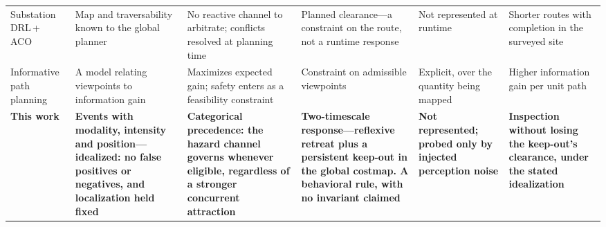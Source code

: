 \begin{table}[!t]
\begin{tabular}{p{2.0cm}p{2.9cm}p{3.0cm}p{2.8cm}p{2.4cm}p{2.6cm}}
Substation DRL\,+\,ACO~\cite{zhang2025substation} &
Map and traversability known to the global planner &
No reactive channel to arbitrate; conflicts resolved at planning time &
Planned clearance---a constraint on the route, not a runtime response &
Not represented at runtime &
Shorter routes with completion in the surveyed site \\

Informative path planning~\cite{ipp2024nonconvex} &
A model relating viewpoints to information gain &
Maximizes expected gain; safety enters as a feasibility constraint &
Constraint on admissible viewpoints &
Explicit, over the quantity being mapped &
Higher information gain per unit path \\

\textbf{This work} &
\textbf{Events with modality, intensity and position---idealized: no false
positives or negatives, and localization held fixed} &
\textbf{Categorical precedence: the hazard channel governs whenever eligible,
regardless of a stronger concurrent attraction} &
\textbf{Two-timescale response---reflexive retreat plus a persistent keep-out in
the global costmap. A behavioral rule, with no invariant claimed} &
\textbf{Not represented; probed only by injected perception noise} &
\textbf{Inspection without losing the keep-out's clearance, under the stated
idealization} \\
\hline
\end{tabular}
\end{table}
